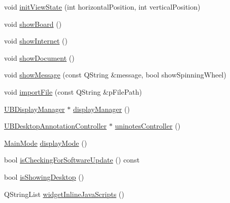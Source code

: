 \begin{DoxyCompactItemize}
\item 
void \hyperlink{class_u_b_application_controller_a08b1f4c2db7f5005579800cac076234c}{init\-View\-State} (int horizontal\-Position, int vertical\-Position)
\item 
void \hyperlink{class_u_b_application_controller_ae4a1adf81a7b5d4f5d6120699833f0bb}{show\-Board} ()
\item 
void \hyperlink{class_u_b_application_controller_ae3d983750cf95a35f7e125f57844957f}{show\-Internet} ()
\item 
void \hyperlink{class_u_b_application_controller_a074e9435d9ab3aff5d05ab47e5a37e3e}{show\-Document} ()
\item 
void \hyperlink{class_u_b_application_controller_aaefcc19888d509988d3e82b334d76830}{show\-Message} (const Q\-String \&message, bool show\-Spinning\-Wheel)
\item 
void \hyperlink{class_u_b_application_controller_a37354fade87a383adbda6d60acd26caa}{import\-File} (const Q\-String \&p\-File\-Path)
\item 
\hyperlink{class_u_b_display_manager}{U\-B\-Display\-Manager} $\ast$ \hyperlink{class_u_b_application_controller_aa5bf5b9c21547340bc4582aeb8d343c0}{display\-Manager} ()
\item 
\hyperlink{class_u_b_desktop_annotation_controller}{U\-B\-Desktop\-Annotation\-Controller} $\ast$ \hyperlink{class_u_b_application_controller_aaaff30b4c0a3dbc89bbc292d013cb9a8}{uninotes\-Controller} ()
\item 
\hyperlink{class_u_b_application_controller_a72ac04dd6883ac94b53e8e1dcdf2af39}{Main\-Mode} \hyperlink{class_u_b_application_controller_a9ce27c18f3093893087d8f2de6ef45c2}{display\-Mode} ()
\item 
bool \hyperlink{class_u_b_application_controller_a168e1dbc0934683ed4e76c57a8665657}{is\-Checking\-For\-Software\-Update} () const 
\item 
bool \hyperlink{class_u_b_application_controller_ad6b4c058a1e6abd95fee627310590532}{is\-Showing\-Desktop} ()
\item 
Q\-String\-List \hyperlink{class_u_b_application_controller_a6e16c1c071fab3c55732f8a91c541d93}{widget\-Inline\-Java\-Scripts} ()
\end{DoxyCompactItemize}
